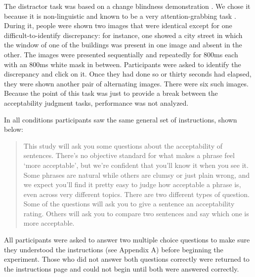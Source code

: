 \documentclass[doc]{apa6}
\begin{document}
The distractor task was based on a change blindness demonstration \citep{simons2005changeblindness}. We chose it because it is non-linguistic and known to be a very attention-grabbing task \citep{rensink1997needforattention}. During it, people were shown two images that were identical except for one difficult-to-identify discrepancy: for instance, one showed a city street in which the window of one of the buildings was present in one image and absent in the other. The images were presented sequentially and repeatedly for 800ms each with an 800ms white mask in between. Participants were asked to identify the discrepancy and click on it. Once they had done so or thirty seconds had elapsed, they were shown another pair of alternating images. There were six such images. Because the point of this task was just to provide a break between the acceptability judgment tasks, performance was not analyzed.

In all conditions participants saw the same general set of instructions, shown below:

 \begin{quote}
 This study will ask you some questions about the acceptability of sentences. There's no objective standard for what makes a phrase feel `more acceptable', but we're confident that you'll know it when you see it. Some phrases are natural while others are clumsy or just plain wrong, and we expect you'll find it pretty easy to judge how acceptable a phrase is, even across very different topics. There are two different types of question. Some of the questions will ask you to give a sentence an acceptability rating. Others will ask you to compare two sentences and say which one is more acceptable.
 \end{quote}


All participants were asked to answer two multiple choice questions to make sure they understood the instructions (see Appendix A) before beginning the experiment. Those who did not answer both questions correctly were returned to the instructions page and could not begin until both were answered correctly.
\end{document}
